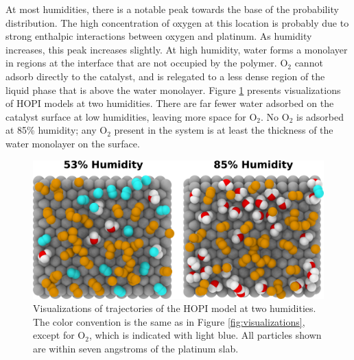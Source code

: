 \documentclass[journal=jacsat,manuscript=article]{achemso}
\begin{document}
At most humidities, there is a notable peak towards the base of the probability distribution. The high concentration of oxygen at this location is probably due to strong enthalpic interactions between oxygen and platinum. As humidity increases, this peak increases slightly. At high humidity, water forms a monolayer in regions at the interface that are not occupied by the polymer. O$_2$ cannot adsorb directly to the catalyst, and is relegated to a less dense region of the liquid phase that is above the water monolayer. Figure \ref{fig:o2-slab} presents visualizations of HOPI models at two humidities. There are far fewer water adsorbed on the catalyst surface at low humidities, leaving more space for O$_2$. No O$_2$ is adsorbed at 85\% humidity; any O$_2$ present in the system is at least the thickness of the water monolayer on the surface. 
\begin{figure}[h!]
  \includegraphics[width=.9\linewidth]{adsorbatevis.png}
  \centering
  \caption{Visualizations of trajectories of the HOPI model at two humidities. The color convention is the same as in Figure \ref{fig:visualizations}, except for O$_2$, which is indicated with light blue. All particles shown are within seven angstroms of the platinum slab.} 
  \label{fig:o2-slab}
\end{figure}
\end{document}
